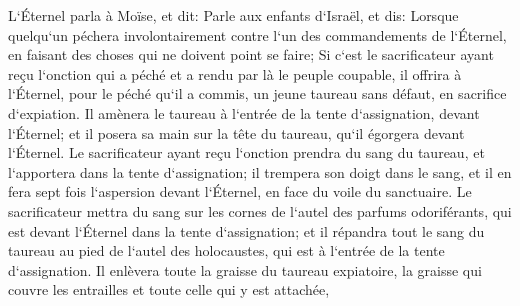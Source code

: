 \verse L`Éternel parla à Moïse, et dit: 
\verse Parle aux enfants d`Israël, et dis: Lorsque quelqu`un péchera involontairement contre l`un des commandements de l`Éternel, en faisant des choses qui ne doivent point se faire; 
\verse Si c`est le sacrificateur ayant reçu l`onction qui a péché et a rendu par là le peuple coupable, il offrira à l`Éternel, pour le péché qu`il a commis, un jeune taureau sans défaut, en sacrifice d`expiation. 
\verse Il amènera le taureau à l`entrée de la tente d`assignation, devant l`Éternel; et il posera sa main sur la tête du taureau, qu`il égorgera devant l`Éternel. 
\verse Le sacrificateur ayant reçu l`onction prendra du sang du taureau, et l`apportera dans la tente d`assignation; 
\verse il trempera son doigt dans le sang, et il en fera sept fois l`aspersion devant l`Éternel, en face du voile du sanctuaire. 
\verse Le sacrificateur mettra du sang sur les cornes de l`autel des parfums odoriférants, qui est devant l`Éternel dans la tente d`assignation; et il répandra tout le sang du taureau au pied de l`autel des holocaustes, qui est à l`entrée de la tente d`assignation. 
\verse Il enlèvera toute la graisse du taureau expiatoire, la graisse qui couvre les entrailles et toute celle qui y est attachée, 
